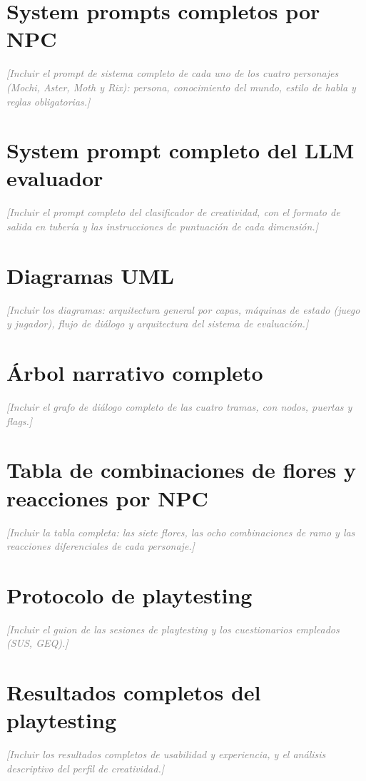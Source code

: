 \documentclass[12pt,twoside,titlepage]{report}
\begin{document}
\chapter{System prompts completos por NPC}
\textcolor{gray}{\textit{[Incluir el prompt de sistema completo de cada uno de los cuatro personajes (Mochi, Aster, Moth y Rix): persona, conocimiento del mundo, estilo de habla y reglas obligatorias.]}}

\chapter{System prompt completo del LLM evaluador}
\textcolor{gray}{\textit{[Incluir el prompt completo del clasificador de creatividad, con el formato de salida en tubería y las instrucciones de puntuación de cada dimensión.]}}

\chapter{Diagramas UML}
\textcolor{gray}{\textit{[Incluir los diagramas: arquitectura general por capas, máquinas de estado (juego y jugador), flujo de diálogo y arquitectura del sistema de evaluación.]}}

\chapter{Árbol narrativo completo}
\textcolor{gray}{\textit{[Incluir el grafo de diálogo completo de las cuatro tramas, con nodos, puertas y flags.]}}

\chapter{Tabla de combinaciones de flores y reacciones por NPC}
\textcolor{gray}{\textit{[Incluir la tabla completa: las siete flores, las ocho combinaciones de ramo y las reacciones diferenciales de cada personaje.]}}

\chapter{Protocolo de playtesting}
\textcolor{gray}{\textit{[Incluir el guion de las sesiones de playtesting y los cuestionarios empleados (SUS, GEQ).]}}

\chapter{Resultados completos del playtesting}
\textcolor{gray}{\textit{[Incluir los resultados completos de usabilidad y experiencia, y el análisis descriptivo del perfil de creatividad.]}}

\end{document}
